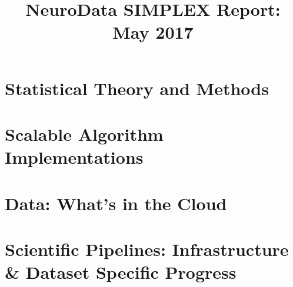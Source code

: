 \documentclass[12pt]{article}
\title{NeuroData SIMPLEX Report: May 2017}
\begin{document}

\newpage



\section{Statistical Theory and Methods}
%

%
%

%


%
%
%
%

\section{Scalable Algorithm Implementations}

%

%

\section{Data: What's in the Cloud}


\section{Scientific Pipelines: Infrastructure \& Dataset Specific Progress}

%
%
%
%
%







\end{document}
